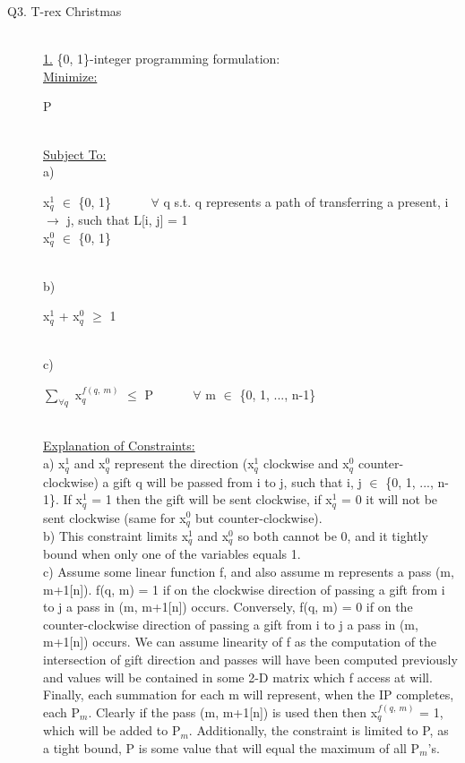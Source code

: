 \documentclass[10pt]{csc_assignment}
\begin{document}
\begin{description}

\newpage
\item[Q3. T-rex Christmas]
~\\
\underline{1.} \{0, 1\}-integer programming formulation:\\
\underline{Minimize:}\\
\hspace*{1cm}\parbox{15cm}{
P
}\\
\underline{Subject To:}\\
a) \\
\hspace*{1cm}\parbox{15cm}{
x$_{q}^1$ $\in$ \{0, 1\} ~~~~~ $\forall$ q s.t. q represents a path of transferring a present, i $\rightarrow$ j, such that L[i, j] = 1\\
x$_{q}^0$ $\in$ \{0, 1\} 
}\\
b)\\
\hspace*{1cm}\parbox{15cm}{
x$_{q}^1$ + x$_{q}^0$ $\geqslant$ 1\\
}\\
c)\\
\hspace*{1cm}\parbox{15cm}{
$\sum_{\forall q}$ x$_{q}^{f(q,~ m)}$ $\leqslant$ P ~~~~~ $\forall$ m $\in$ \{0, 1, ..., n-1\}\\
}\\
\underline{Explanation of Constraints:}\\
a) x$_{q}^1$ and x$_{q}^0$ represent the direction (x$_{q}^1$ clockwise and x$_{q}^0$ counter-clockwise) a gift q will be passed from i to j, such that i, j $\in$ \{0, 1, ..., n-1\}. If x$_{q}^1$ = 1 then the gift will be sent clockwise, if x$_{q}^1$ = 0 it will not be sent clockwise (same for x$_{q}^0$ but counter-clockwise).\\
b) This constraint limits x$_{q}^1$ and x$_{q}^0$ so both cannot be 0, and it tightly bound when only one of the variables equals 1.\\
c) Assume some linear function f, and also assume m represents a pass (m, m+1[n]). f(q, m) = 1 if on the clockwise direction of passing a gift from i to j a pass in (m, m+1[n]) occurs. Conversely, f(q, m) = 0 if on the counter-clockwise direction of passing a gift from i to j a pass in (m, m+1[n]) occurs. We can assume linearity of f as the computation of the intersection of gift direction and passes will have been computed previously and values will be contained in some 2-D matrix which f access at will. Finally, each summation for each m will represent, when the IP completes, each P$_{m}$. Clearly if the pass (m, m+1[n]) is used then then x$_{q}^{f(q,~ m)}$ = 1, which will be added to P$_{m}$. Additionally, the constraint is limited to P, as a tight bound, P is some value that will equal the maximum of all P$_{m}$'s.\\ 


\end{description}
\end{document}
